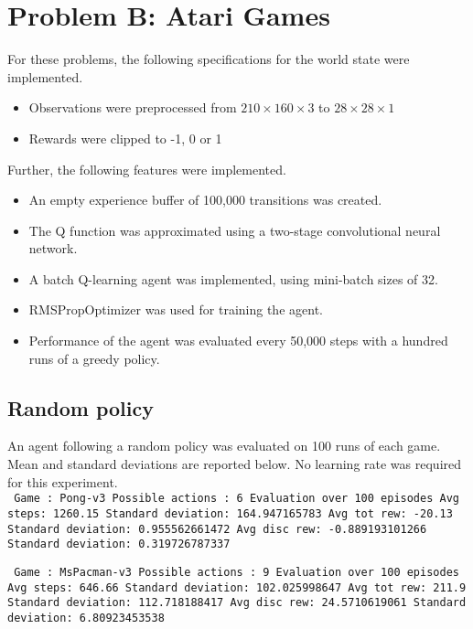 \documentclass[paper=a4, fontsize=11pt]{scrartcl} %
\numberwithin{equation}{section} %
\numberwithin{figure}{section} %
\numberwithin{table}{section} %
\begin{document}
\section{Problem B: Atari Games}
For these problems, the following specifications for the world state were implemented.
\begin{itemize}
\item Observations were preprocessed from $210 \times 160 \times 3$ to $28 \times 28 \times 1$
\item Rewards were clipped to -1, 0 or 1
\end{itemize}
Further, the following features were implemented.
\begin{itemize}
\item An empty experience buffer of 100,000 transitions was created.
\item The Q function was approximated using a two-stage convolutional neural network.
\item A batch Q-learning agent was implemented, using mini-batch sizes of 32.
\item RMSPropOptimizer was used for training the agent.
\item Performance of the agent was evaluated every 50,000 steps with a hundred runs of a greedy policy.
\end{itemize}

\subsection{Random policy}
An agent following a random policy was evaluated on 100 runs of each game. Mean and standard deviations are reported below. No learning rate was required for this experiment.\\

\texttt{
Game : Pong-v3 \newline
Possible actions : 6 \newline
Evaluation over 100 episodes \newline
Avg steps: 1260.15 \quad\quad\quad\quad\quad\quad\quad  Standard deviation: 164.947165783 \newline
Avg tot rew: -20.13 \quad\quad\quad\quad\quad\quad\quad  Standard deviation: 0.955562661472 \newline
Avg disc rew: -0.889193101266 \quad\quad Standard deviation: 0.319726787337 \newline
}

\texttt{
Game : MsPacman-v3 \newline
Possible actions : 9 \newline
Evaluation over 100 episodes \newline
Avg steps: 646.66 \quad\quad\quad\quad\quad\quad\quad\quad  Standard deviation: 102.025998647 \newline
Avg tot rew: 211.9 \quad\quad\quad\quad\quad\quad\quad\quad Standard deviation: 112.718188417 \newline
Avg disc rew: 24.5710619061 \quad\quad\quad  Standard deviation: 6.80923453538 \newline
}
\end{document}
